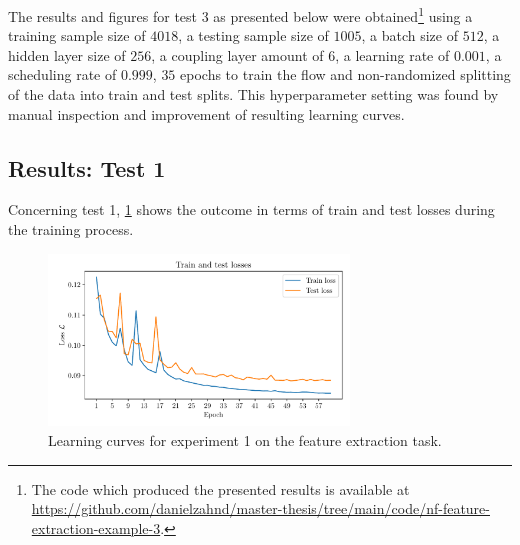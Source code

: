 \documentclass[a4paper,11pt]{report}
\def\fc#1{{\color{black}{#1}}} %
\begin{document}
The results and figures for test 3 as presented below were obtained\footnote{The code which produced the presented results is available at \url{https://github.com/danielzahnd/master-thesis/tree/main/code/nf-feature-extraction-example-3}.} using a training sample size of $4018$, a testing sample size of $1005$, a batch size of $512$, a hidden layer size of $256$, a coupling layer amount of $6$, a learning rate of $0.001$, a scheduling rate of $0.999$, $35$ epochs to train the flow and non-randomized splitting of the data into train and test splits. This hyperparameter setting was found by manual inspection and improvement of resulting learning curves. \fc{The sample size for posterior probability densities was chosen to be $10000$.}

\subsection{Results: Test 1}
Concerning test 1, \cref{fig:nf-feature-extraction-example-1-loss} shows the outcome in terms of train and test losses during the training process. \fc{As one can see at first sight, there are many jumps in both the train and test loss curves. Additionally, after about 40 epochs, the train loss can be observed to be continuously decreasing, while the test loss remains largely constant. Furthermore, the test loss shows some small-scale oscillations after around epoch 29.}
\begin{figure}[h!]
	\centering
	\includegraphics[width=8cm]{figures/nf-feature-extraction-example-1-loss.pdf}
	\caption{Learning curves for experiment 1 on the feature extraction task.}
	\label{fig:nf-feature-extraction-example-1-loss}
\end{figure}
\end{document}
